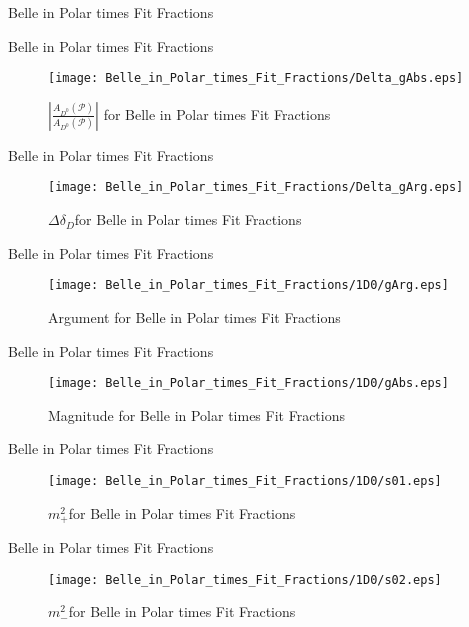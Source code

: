 \documentclass{beamer}
\newcommand{\strphdiff}{\ensuremath{\Delta \delta_D}}
\newcommand{\MP}{\ensuremath{m^2_+}}
\newcommand{\MM}{\ensuremath{m^2_-}}
\newcommand{\Dz}{\ensuremath{D^0} }
\newcommand{\genAmp}[2]{\ensuremath{A_{#1}^{\text{#2}}\left(\mathcal{P} \right)}}
\begin{document}
\begin{frame}{Belle in Polar times Fit Fractions}
\begin{tiny}
\end{tiny}
\end{frame}
\begin{frame}{Belle in Polar times Fit Fractions}
\begin{figure}
\texttt{[image: Belle\_in\_Polar\_times\_Fit\_Fractions/Delta\_gAbs.eps]}
\caption{$\left|\frac{\genAmp{\Dz}{}}{\genAmp{\Dz}{}}\right|$ for Belle in Polar times Fit Fractions}
\end{figure}
\end{frame}
\begin{frame}{Belle in Polar times Fit Fractions}
\begin{figure}
\texttt{[image: Belle\_in\_Polar\_times\_Fit\_Fractions/Delta\_gArg.eps]}
\caption{\strphdiff for Belle in Polar times Fit Fractions}
\end{figure}
\end{frame}
\begin{frame}{Belle in Polar times Fit Fractions}
\begin{figure}
\texttt{[image: Belle\_in\_Polar\_times\_Fit\_Fractions/1D0/gArg.eps]}
\caption{Argument for Belle in Polar times Fit Fractions}
\end{figure}
\end{frame}
\begin{frame}{Belle in Polar times Fit Fractions}
\begin{figure}
\texttt{[image: Belle\_in\_Polar\_times\_Fit\_Fractions/1D0/gAbs.eps]}
\caption{Magnitude for Belle in Polar times Fit Fractions}
\end{figure}
\end{frame}
\begin{frame}{Belle in Polar times Fit Fractions}
\begin{figure}
\texttt{[image: Belle\_in\_Polar\_times\_Fit\_Fractions/1D0/s01.eps]}
\caption{\MP for Belle in Polar times Fit Fractions}
\end{figure}
\end{frame}
\begin{frame}{Belle in Polar times Fit Fractions}
\begin{figure}
\texttt{[image: Belle\_in\_Polar\_times\_Fit\_Fractions/1D0/s02.eps]}
\caption{\MM for Belle in Polar times Fit Fractions}
\end{figure}
\end{frame}
\end{document}
